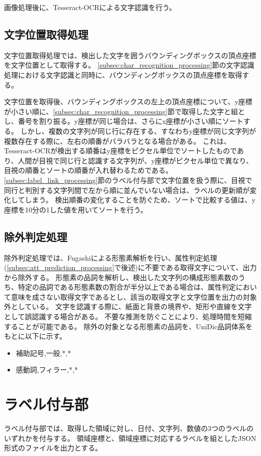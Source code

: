 画像処理後に、Tesseract-OCRによる文字認識を行う。

\subsection{文字位置取得処理}\label{subsec:char_position_obtainment_processing}
文字位置取得処理では、検出した文字を囲うバウンディングボックスの頂点座標を文字位置として取得する。
\ref{subsec:char_recognition_processing}節の文字認識処理における文字認識と同時に、バウンディングボックスの頂点座標を取得する。

文字位置を取得後、バウンディングボックスの左上の頂点座標について、y座標が小さい順に、\ref{subsec:char_recognition_processing}節で取得した文字と組とし、番号を割り振る。y座標が同じ場合は、さらにx座標が小さい順にソートする。
しかし、複数の文字列が同じ行に存在する、すなわちy座標が同じ文字列が複数存在する際に、左右の順番がバラバラとなる場合がある。
これは、Tesseract-OCRが検出する順番はy座標をピクセル単位でソートしたものであり、人間が目視で同じ行と認識する文字列が、y座標がピクセル単位で異なり、目視の順番とソートの順番が入れ替わるためである。
\ref{subsec:label_link_processing}節のラベル付与部で文字位置を扱う際に、目視で同行と判別する文字列間で左から順に並んでいない場合は、ラベルの更新順が変化してしまう。
検出順番の変化することを防ぐため、ソートで比較する値は、y座標を10分の1した値を用いてソートを行う。


\subsection{除外判定処理}\label{subsec:exclusion_judgement_processing}
除外判定処理では、Fugashiによる形態素解析を行い、属性判定処理(\ref{subsec:att_prediction_processing}で後述)に不要である取得文字について、出力から除外する。
形態素の品詞を解析し、検出した文字列の構成形態素数のうち、特定の品詞である形態素数の割合が半分以上である場合は、属性判定において意味を成さない取得文字であるとし、該当の取得文字と文字位置を出力の対象外としている。
文字を認識する際に、紙面と背景の境界や、矩形や直線を文字として誤認識する場合がある。
不要な推測を防ぐことにより、処理時間を短縮することが可能である。
除外の対象となる形態素の品詞を、UniDic品詞体系をもとに以下に示す。

\begin{itemize}
    \item 補助記号,一般,*,*
    \item 感動詞,フィラー,*,*
\end{itemize}


\section{ラベル付与部}\label{sec:label_link_part}
ラベル付与部では、取得した領域に対し、日付、文字列、数値の3つのラベルのいずれかを付与する。
領域座標と、領域座標に対応するラベルを組としたJSON形式のファイルを出力とする。



